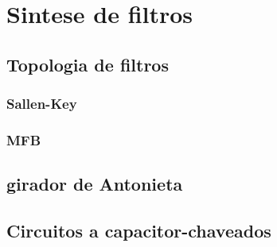 
\chapter{Sintese de filtros}
\label{chap: sintese}

\section{Topologia de filtros}

\subsection{Sallen-Key}

\subsection{MFB}

\section{girador de Antonieta}

\section{Circuitos a capacitor-chaveados}